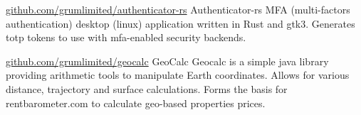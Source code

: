 

\begin{cventries}

  \cventry
    {\href{https://github.com/grumlimited/authenticator-rs}{github.com/grumlimited/authenticator-rs}} %
     {\hspace{0.2em}Authenticator-rs} %
    {} %
    {} %
    {}
    {
MFA (multi-factors authentication) desktop (linux) application written in Rust and gtk3. Generates totp tokens to use with mfa-enabled security backends.
    }


  \cventry
    {\href{https://github.com/grumlimited/geocalc}{github.com/grumlimited/geocalc}} %
    {\hspace{0.2em}GeoCalc} %
    {} %
    {} %
    {}
    {
Geocalc is a simple java library providing arithmetic tools to manipulate Earth coordinates. Allows for various distance, trajectory and surface calculations. Forms the basis for rentbarometer.com
to calculate geo-based properties prices.
    }

\end{cventries}
